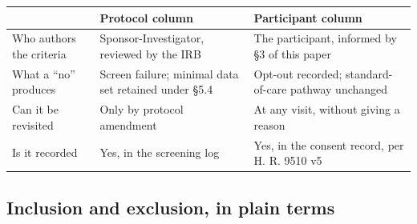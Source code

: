 \vspace{-0.7cm}

\vspace{0.30em}

\noindent\begin{tabularx}{\textwidth}{L{3.5cm} L{5.0cm} Y}
\toprule
\textbf{} & \textbf{Protocol column} & \textbf{Participant column} \\
\midrule
Who authors the criteria & Sponsor-Investigator, reviewed by the IRB & The participant, informed by \S 3 of this paper \\
What a ``no'' produces & Screen failure; minimal data set retained under \S 5.4 & Opt-out recorded; standard-of-care pathway unchanged \\
Can it be revisited & Only by protocol amendment & At any visit, without giving a reason \\
Is it recorded & Yes, in the screening log & Yes, in the consent record, per H. R. 9510 v5 \\
\bottomrule
\end{tabularx}

\vspace{0.30em}

\subsection{Inclusion and exclusion, in plain terms}

\vspace{0.30em}

